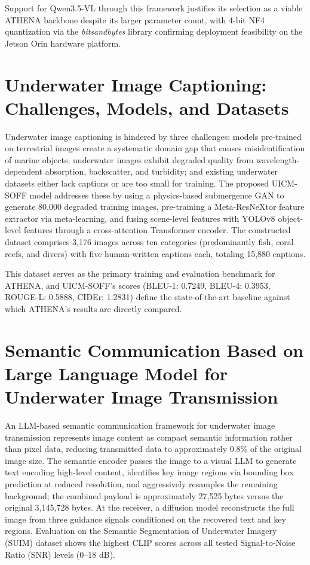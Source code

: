 Support for Qwen3.5-VL through this framework justifies its selection as a viable ATHENA backbone despite its larger parameter count, with 4-bit NF4 quantization via the \textit{bitsandbytes} library confirming deployment feasibility on the Jetson Orin hardware platform.

\section[H. Li, Wang, Zhang, L. Li \& Ren]{Underwater Image Captioning: Challenges, Models, and Datasets~\cite{mainref}}
Underwater image captioning is hindered by three challenges: models pre-trained on terrestrial images create a systematic domain gap that causes misidentification of marine objects; underwater images exhibit degraded quality from wavelength-dependent absorption, backscatter, and turbidity; and existing underwater datasets either lack captions or are too small for training. The proposed UICM-SOFF model addresses these by using a physics-based submergence GAN to generate 80,000 degraded training images, pre-training a Meta-ResNeXtor feature extractor via meta-learning, and fusing scene-level features with YOLOv8 object-level features through a cross-attention Transformer encoder. The constructed dataset comprises 3,176 images across ten categories (predominantly fish, coral reefs, and divers) with five human-written captions each, totaling 15,880 captions.

This dataset serves as the primary training and evaluation benchmark for ATHENA, and UICM-SOFF's scores (BLEU-1: 0.7249, BLEU-4: 0.3953, ROUGE-L: 0.5888, CIDEr: 1.2831) define the state-of-the-art baseline against which ATHENA's results are directly compared.

\section[W. Chen, Xu, H. Chen, X. Zhang, Qin, Y. Zhang \& Han]{Semantic
Communication Based on Large Language Model for Underwater Image
Transmission~\cite{chen1}} An LLM-based semantic communication framework for
underwater image transmission represents image content as compact semantic
information rather than pixel data, reducing transmitted data to approximately
0.8\% of the original image size. The semantic encoder passes the image to a
visual LLM to generate text encoding high-level content, identifies key image
regions via bounding box prediction at reduced resolution, and aggressively
resamples the remaining background; the combined payload is approximately 27,525
bytes versus the original 3,145,728 bytes. At the receiver, a diffusion model
reconstructs the full image from three guidance signals conditioned on the
recovered text and key regions. Evaluation on the Semantic Segmentation of Underwater Imagery (SUIM) dataset shows the highest
CLIP scores across all tested Signal-to-Noise Ratio (SNR) levels (0--18 dB).

